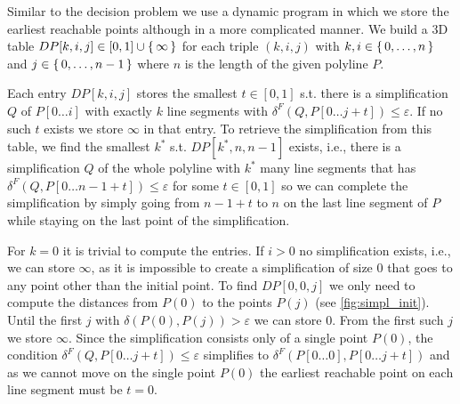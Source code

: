 Similar to the decision problem we use a dynamic program in which we store the earliest reachable points although in a more complicated manner. We build a 3D table \(DP[k,i,j] \in [0, 1] \cup \set{\infty}\) for each triple \((k, i, j)\) with \(k, i \in \set{0, \dots, n}\) and \(j \in \set{0, \dots, n - 1}\) where \(n\) is the length of the given polyline \(P\). 

Each entry \(DP[k, i, j]\) stores the smallest \(t \in [0, 1]\) s.t. there is a simplification \(Q\) of \(P[0 \dots i]\) with exactly \(k\) line segments with \(\delta^F(Q, P[0\dots j + t]) \leq \varepsilon\). If no such \(t\) exists we store \(\infty\) in that entry. 
To retrieve the simplification from this table, we find the smallest \(k^*\) s.t. \(DP[k^*, n, n - 1]\) exists, i.e., there is a simplification \(Q\) of the whole polyline with \(k^*\) many line segments that has \(\delta^F(Q, P[0\dots n - 1 + t]) \leq \varepsilon\) for some \(t \in [0, 1]\) so we can complete the simplification by simply going from \(n-1+t\) to \(n\) on the last line segment of \(P\) while staying on the last point of the simplification. 

For \(k = 0\) it is trivial to compute the entries. If \(i > 0\) no simplification exists, i.e., we can store \(\infty\), as it is impossible to create a simplification of size \(0\) that goes to any point other than the initial point. To find \(DP[0, 0, j]\) we only need to compute the distances from \(P(0)\) to the points \(P(j)\) (see \cref{fig:simpl_init}). Until the first \(j\) with \(\delta(P(0), P(j)) > \varepsilon\) we can store \(0\). From the first such \(j\) we store \(\infty\). Since the simplification consists only of a single point \(P(0)\), the condition \(\delta^F(Q, P[0\dots j + t]) \leq \varepsilon\) simplifies to \(\delta^F(P[0 \dots 0], P[0 \dots j + t])\) and as we cannot move on the single point \(P(0)\) the earliest reachable point on each line segment must be \(t = 0\). 

